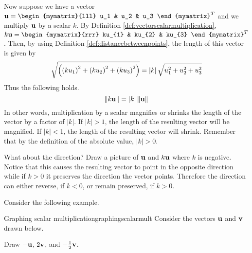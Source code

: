 Now suppose we have a vector $\vect{u} = \begin{mymatrix}{lll}
u_1 &  u_2 & u_3 
\end{mymatrix}^T$ and we multiply ${\bf u}$ by a
scalar $k$. By Definition \ref{def:vectorscalarmultiplication},
$k\vect{u} = \begin{mymatrix}{rrr}
ku_{1} & ku_{2} & ku_{3}
\end{mymatrix}^T $. 
Then, by using Definition \ref{def:distancebetweenpoints}, the length of this vector is given by 
\begin{equation*}
\sqrt{\left(\left(k u_{1}\right) ^{2}+\left(k u_{2}\right)
^{2}+\left(k u_{3}\right) ^{2}\right) }=\left\vert k \right\vert
\sqrt{u_{1}^{2}+u_{2}^{2}+u_{3}^{2}}
\end{equation*}
Thus the following holds.
\begin{equation*}
\| k {\bf u} \| =\left\vert k \right\vert
\| {\bf u} \| 
\end{equation*}
In other words, multiplication by a scalar magnifies or shrinks the length
of the vector by a factor of $\left\vert k \right\vert$. If $\left\vert k \right\vert > 1$, the length of the resulting vector will 
be magnified. If $\left\vert k \right\vert <1$, the length of the resulting vector will shrink. Remember that by the definition 
of the absolute value, $\left\vert k \right\vert >0$. 

What about the direction? Draw a picture of ${\bf u}$ and $k{\bf u}$
where $k$ is negative. Notice that this causes the resulting vector
to point in the opposite direction while if $k >0$ it preserves the
direction the vector points. Therefore the direction can either
reverse, if $k < 0$, or remain preserved, if $k > 0$.

Consider the following example.

\begin{example}{Graphing scalar multiplication}{graphingscalarmult}
Consider the vectors ${\bf u}$ and ${\bf v}$ drawn below. 

\begin{center}
\end{center}

Draw  $-{\bf u}$, $2{\bf v}$, and $-\frac{1}{2}{\bf v}$.
\end{example}

